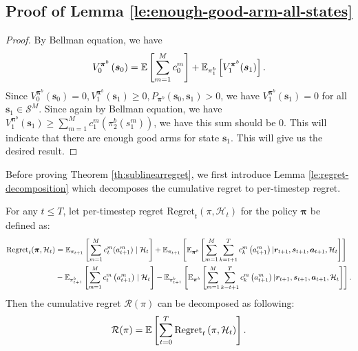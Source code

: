 \subsection{Proof of Lemma \ref{le:enough-good-arm-all-states}}\label{proof:enough-good-arm-all-states}
\sufficientgoodarms*
\begin{proof}
    By Bellman equation, we have
    \begin{equation*}
V^{\bm{\pi}^b}_0\left(\bm{s}_0\right)=\mathbb{E}\left[\sum_{m=1}^Mc_0^m\right]+\mathbb{E}_{\pi_1^b}\left[V^{\bm{\pi}^b}_1(\bm{s}_1)\right].
    \end{equation*}
    Since $V^{\bm{\pi}^b}_0\left(\bm{s}_0\right)=0, V^{\bm{\pi}^b}_1(\bm{s}_1)\geq 0, P_{\bm{\pi}^b}(\bm{s}_0,\bm{s}_1)>0$, we have $V^{\bm{\pi}^b}_1(\bm{s}_1)=0$ for all $\bm{s}_1\in\mathcal{S}^M$. Since again by Bellman equation, we have $V^{\bm\pi^b}_1(\bm{s}_1)\geq \sum_{m=1}^M c_1^m\left(\pi_2^b(s_1^m)\right)$, we have this sum should be 0. This will indicate that there are enough good arms for state $\bm{s}_1$. This will give us the desired result.
\end{proof}
Before proving Theorem \ref{th:sublinearregret}, we first introduce Lemma \ref{le:regret-decomposition} which decomposes the cumulative regret to per-timestep regret.
\begin{lemma}\label{le:regret-decomposition}
    For any $t\leq T$, let per-timestep regret $\text{Regret}_t(\pi,\mathcal{H}_t)$ for the policy $\bm{\pi}$ be defined as:
    \begin{align*}
        \text{Regret}_t(\bm{\pi},\mathcal{H}_t)&=\mathbb{E}_{\pi_{t+1}}\left[\sum_{m=1}^M c_{t}^m(a_{t+1}^m)\mid\mathcal{H}_t\right]+\mathbb{E}_{\pi_{t+1}}\left[\mathbb{E}_{\bm{\pi}^b}\left[\sum_{m=1}^M\sum_{k=t+1}^T c_k^m\left(a_{t+1}^m\right)|\bm{r}_{t+1},\bm{s}_{t+1},\bm{a}_{t+1},\mathcal{H}_t\right]\right]\\&-\mathbb{E}_{\pi_{t+1}^b}\left[\sum_{m=1}^M c_{t}^m\left(a_{t+1}^m\right)\mid \mathcal{H}_t\right]-\mathbb{E}_{\pi_{t+1}^b}\left[\mathbb{E}_{\bm{\pi}^b}\left[\sum_{m=1}^M\sum_{k=t+1}^T c_k^m\left(a_{t+1}^m\right)|\bm{r}_{t+1},\bm{s}_{t+1},\bm{a}_{t+1},\mathcal{H}_t\right]\right].
    \end{align*} 
    Then the cumulative regret $\mathcal{R}(\pi)$ can be decomposed as following:
    \begin{equation*}
        \mathcal{R}(\pi)=\mathbb{E}\left[\sum_{t=0}^T\text{Regret}_t\left(\pi,\mathcal{H}_t\right)\right].
    \end{equation*}
\end{lemma}
